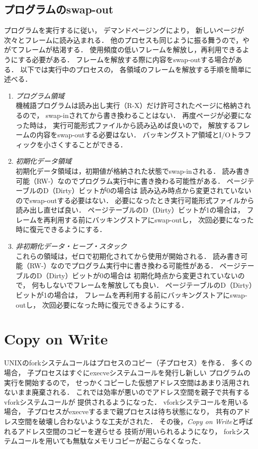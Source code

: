 \subsection{プログラムのswap-out}
プログラムを実行するに従い，
デマンドページングにより，
新しいページが次々とフレームに読み込まれる．
他のプロセスも同じように振る舞うので，やがてフレームが枯渇する．
使用頻度の低いフレームを解放し，再利用できるようにする必要がある．
フレームを解放する際に内容をswap-outする場合がある．
以下では実行中のプロセスの，
各領域のフレームを解放する手順を簡単に述べる．

\begin{enumerate}
\item \emph{プログラム領域} \\
機械語プログラムは読み出し実行（R-X）だけ許可されたページに格納されるので，
swap-inされてから書き換わることはない．
再度ページが必要になった時は，
実行可能形式ファイルから読み込めば良いので，
解放するフレームの内容をswap-outする必要はない．
バッキングストア領域とI/Oトラフィックを小さくすることができる．

\item \emph{初期化データ領域} \\
初期化データ領域は，初期値が格納された状態でswap-inされる．
読み書き可能（RW-）なのでプログラム実行中に書き換わる可能性がある．
ページテーブルのD（Dirty）ビットが0の場合は
読み込み時点から変更されていないのでswap-outする必要はない．
必要になったとき実行可能形式ファイルから読み出し直せば良い．
ページテーブルのD（Dirty）ビットが1の場合は，
フレームを再利用する前にバッキングストアにswap-outし，
次回必要になった時に復元できるようにする．

\item \emph{非初期化データ・ヒープ・スタック} \\
これらの領域は，ゼロで初期化されてから使用が開始される．
読み書き可能（RW-）なのでプログラム実行中に書き換わる可能性がある．
ページテーブルのD（Dirty）ビットが0の場合は
初期化時点から変更されていないので，
何もしないでフレームを解放しても良い．
ページテーブルのD（Dirty）ビットが1の場合は，
フレームを再利用する前にバッキングストアにswap-outし，
次回必要になった時に復元できるようにする．
\end{enumerate}

\section{Copy on Write}
UNIXのforkシステムコールはプロセスのコピー（子プロセス）を作る．
多くの場合，
子プロセスはすぐにexecveシステムコールを発行し新しい
プログラムの実行を開始するので，
せっかくコピーした仮想アドレス空間はあまり活用されないまま廃棄される．
これでは効率が悪いのでアドレス空間を親子で共有するvforkシステムコールが
提供されるようになった．
vforkシステコールを用いる場合，
子プロセスがexecveするまで親プロセスは待ち状態になり，
共有のアドレス空間を破壊し合わないような工夫がされた．
その後，\emph{Copy on Write}と呼ばれるアドレス空間のコピーを遅らせる
技術が用いられるようになり，
forkシステムコールを用いても無駄なメモリコピーが起こらなくなった．

